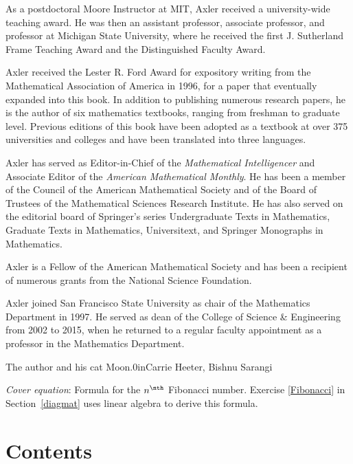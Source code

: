 As a postdoctoral Moore Instructor at MIT, Axler received a university-wide teaching award. He was then an assistant professor, associate professor, and professor at Michigan State University, where he received the first J. Sutherland Frame Teaching Award and the Distinguished Faculty Award.

Axler received the Lester R. Ford Award for expository writing from the Mathematical Association of America in 1996, for a paper that eventually expanded into this book. In addition to publishing numerous research papers, he is the author of six mathematics textbooks, ranging from freshman to graduate level. Previous editions of this book have been adopted as a textbook at over 375 universities and colleges and have been translated into three languages.

Axler has served as Editor-in-Chief of the \textit{Mathematical Intelligencer} and Associate Editor of the \textit{American Mathematical Monthly}. He has been a member of the Council of the American Mathematical Society and of the Board of Trustees of the Mathematical Sciences Research Institute. He has also served on the editorial board of Springer's series Undergraduate Texts in Mathematics, Graduate Texts in Mathematics, Universitext, and Springer Monographs in Mathematics.

Axler is a Fellow of the American Mathematical Society and has been a recipient of numerous grants from the National Science Foundation.

Axler joined San Francisco State University as chair of the Mathematics Department in 1997. He served as dean of the College of Science \& Engineering from 2002 to 2015, when he returned to a regular faculty appointment as a professor in the Mathematics Department.

\smallskip


%
{The author and his cat Moon.}{0in}{Carrie Heeter, Bishnu Sarangi} \label{0moon}

\medskip

\noindent
\textit{Cover equation}: Formula for the $n^\nth$ Fibonacci number. Exercise \ref{Fibonacci} in Section~\ref{diagmat} uses linear algebra to derive this formula.

{\overfullrule=0in

\chapter{Contents}\tableofcontents}

